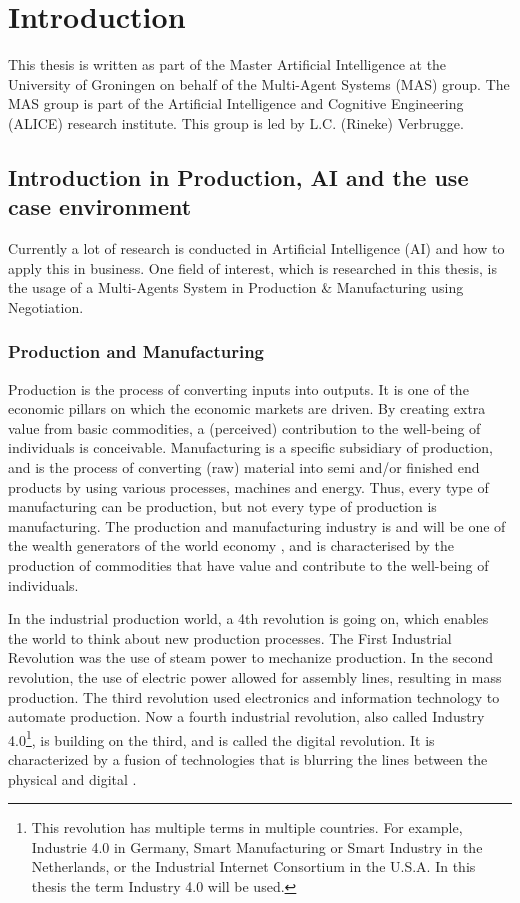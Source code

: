 \chapter{Introduction}
\label{ch:intro}
This thesis is written as part of the Master Artificial Intelligence at the University of Groningen on behalf of the Multi-Agent Systems (MAS) group. The MAS group is part of the Artificial Intelligence and Cognitive Engineering (ALICE) research institute. This group is led by L.C. (Rineke) Verbrugge.  
   
\section{Introduction in Production, AI and the use case environment}

Currently a lot of research is conducted in Artificial Intelligence (AI) and how to apply this in business. One field of interest, which is researched in this thesis, is the usage of a Multi-Agents System in Production \& Manufacturing using Negotiation.

\subsection{Production and Manufacturing}
Production is the process of converting inputs into outputs. It is one of the economic pillars on which the economic markets are driven. By creating extra value from basic commodities, a (perceived) contribution to the well-being of individuals is conceivable. Manufacturing is a specific subsidiary of production, and is the process of converting (raw) material into semi and/or finished end products by using various processes, machines and energy. Thus, every type of manufacturing can be production, but not every type of production is manufacturing. The production and manufacturing industry is and will be one of the wealth generators of the world economy \citep{monostori2006agent}, and is characterised by the production of commodities that have value and contribute to the well-being of individuals.

In the industrial production world, a 4th revolution is going on, which enables the world to think about new production processes. The First Industrial Revolution was the use of steam power to mechanize production. In the second revolution, the use of electric power allowed for assembly lines, resulting in mass production. The third revolution used electronics and information technology to automate production. Now a fourth industrial revolution, also called Industry 4.0\footnote{This revolution has multiple terms in multiple countries. For example, Industrie 4.0 in Germany, Smart Manufacturing or Smart Industry in the Netherlands, or the Industrial Internet Consortium in the U.S.A. In this thesis the term Industry 4.0 will be used.}, is building on the third, and is called the digital revolution. It is characterized by a fusion of technologies that is blurring the lines between the physical and digital \citep{leitao2016smart}.

